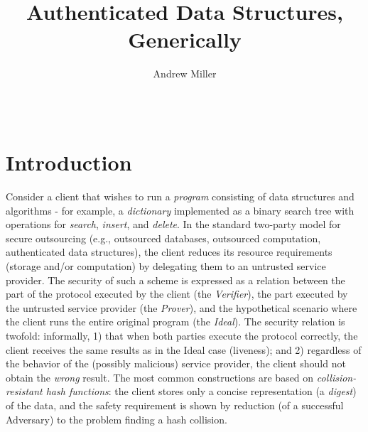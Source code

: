 \documentclass{acm_proc_article-sp}
\begin{document}
\lstset{language=Haskell}

\title{
  Authenticated Data Structures, Generically
}

\author{
\alignauthor
Andrew Miller\\
       \\
       \\
}
\maketitle
\begin{abstract}
\end{abstract}




\section{Introduction}

Consider a client that wishes to run a {\em program} consisting of data structures and algorithms - for example, a {\em dictionary} implemented as a binary search tree with operations for {\em search}, {\em insert}, and {\em delete}. In the standard two-party model for secure outsourcing (e.g., outsourced databases, outsourced computation, authenticated data structures), the client reduces its resource requirements (storage and/or computation) by delegating them to an untrusted service provider. The security of such a scheme is expressed as a relation between the part of the protocol executed by the client (the {\em Verifier}), the part executed by the untrusted service provider (the {\em Prover}), and the hypothetical scenario where the client runs the entire original program (the {\em Ideal}). The security relation is twofold: informally, 1) that when both parties execute the protocol correctly, the client receives the same results as in the Ideal case (liveness); and 2) regardless of the behavior of the (possibly malicious) service provider, the client should not obtain the {\em wrong} result. The most common constructions are based on {\em collision-resistant hash functions}: the client stores only a concise representation (a {\em digest}) of the data, and the safety requirement is shown by reduction (of a successful 
Adversary) to the problem finding a hash collision.
\end{document}
